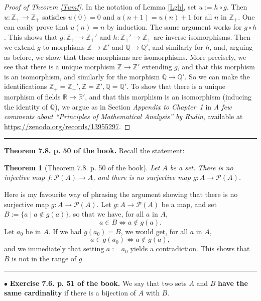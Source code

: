 \documentclass[12pt,letterpaper]{article}
\newtheorem{thm}{Theorem}%
\newcommand{\hs}{\bigskip\hrule\medskip}
\newcommand{\noi}{\noindent}%
\newcommand{\Q}{\mathbb Q}%
\newcommand{\R}{\mathbb R}
\newcommand{\Z}{\mathbb Z}
\begin{document}
\begin{proof}[Proof of Theorem \ref{Tumf}] 
In the notation of Lemma \ref{Lgh}, set $u:=h\circ g$. Then $u:\Z_+\to\Z_+$ satisfies $u(0)=0$ and $u(n+1)=u(n)+1$ for all $n$ in $\Z_+$. One can easily prove that $u(n)=n$ by induction. The same argument works for $g\circ h$. This shows that $g:\Z_+\to\Z_+'$ and $h:\Z_+'\to\Z_+$ are inverse isomorphisms. Then we extend $g$ to morphisms $\Z\to\Z'$ and $\Q\to\Q'$, and similarly for $h$, and, arguing as before, we show that these morphisms are isomorphisms. More precisely, we see that there is a unique morphism $\Z\to\Z'$ extending $g$, and that this morphism is an isomorphism, and similarly for the morphism $\Q\to\Q'$. So we can make the identifications $\Z_+=\Z_+',\Z=\Z',\Q=\Q'$. To show that there is a unique morphism of fields $\R\to\R'$, and that this morphism is an isomorphism (inducing the identity of $\Q$), we argue as in Section \emph{Appendix to Chapter~1} in \emph{A few comments about ``Principles of Mathematical Analysis'' by Rudin}, available at \url{https://zenodo.org/records/13955297}. 
\end{proof} \smallskip

\hrule\medskip

\noi\textbf{Theorem 7.8. p. 50 of the book.} Recall the statement: 

\begin{thm}[Theorem 7.8. p. 50 of the book]
Let $A$ be a set. There is no injective map $f : \mathcal{P}(A) \to A$, and there is no surjective map $g : A \to \mathcal{P}(A)$.
\end{thm} 

Here is my favourite way of phrasing the argument showing that there is no surjective map $g : A \to \mathcal{P}(A)$. Let $g : A \to \mathcal{P}(A)$ be a map, and set $B:=\{a\mid a\notin g(a)\}$, so that we have, for all $a$ in $A$, 
$$
a\in B\iff a\notin g(a).
$$ 
Let $a_0$ be in $A$. If we had $g(a_0)=B$, we would get, for all $a$ in $A$, 
$$
a\in g(a_0)\iff a\notin g(a),
$$ 
and we immediately that setting $a:=a_0$ yields a contradiction. This shows that $B$ is not in the range of $g$. 

\hs

\noi$\bullet$ \textbf{Exercise 7.6. p. 51 of the book.} We say that two sets $A$ and $B$ \textbf{have the same cardinality} if there is a bijection of $A$ with $B$.
\end{document}
